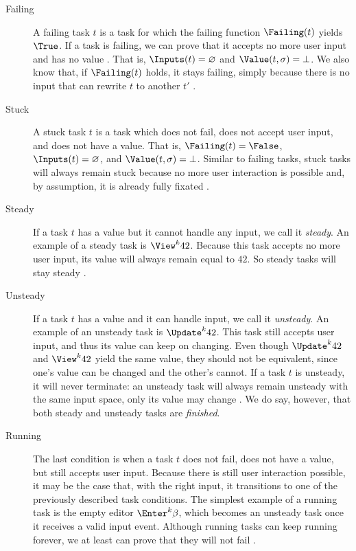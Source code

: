 \begin{description}

  \item[Failing]
    A failing task $t$ is a task for which the failing function $\Failing(t)$ yields $\True$.
    If a task is failing, we can prove that it accepts no more user input and has no value .
    That is, $\Inputs(t) = \nothing$ and $\Value(t,\sigma) = \bot$.
    We also know that, if $\Failing(t)$ holds, it stays failing,
    simply because there is no input that can rewrite $t$ to another $t'$ .

  \item[Stuck]
    A stuck task $t$ is a task which does not fail, does not accept user input, and does not have a value.
    That is, $\Failing(t) = \False$, $\Inputs(t) = \nothing$, and $\Value(t,\sigma) = \bot$.
    Similar to failing tasks, stuck tasks will always remain stuck because no more user interaction is possible and, by assumption, it is already fully fixated .

  \item[Steady]
    If a task $t$ has a value but it cannot handle any input, we call it \emph{steady}.
    An example of a steady task is $\View^k 42$.
    Because this task accepts no more user input, its value will always remain equal to $42$.
    So steady tasks will stay steady .

  \item[Unsteady]
    If a task $t$ has a value and it can handle input, we call it \emph{unsteady}.
    An example of an unsteady task is $\Update^k 42$.
    This task still accepts user input, and thus its value can keep on changing.
    Even though $\Update^k 42$ and $\View^k 42$ yield the same value,
    they should not be equivalent, since one's value can be changed and the other's cannot.
    If a task $t$ is unsteady, it will never terminate: an unsteady task will always remain unsteady with the same input space, only its value may change .
    We do say, however, that both steady and unsteady tasks are \emph{finished}.

  \item[Running]
    The last condition is when a task $t$ does not fail, does not have a value, but still accepts user input.
    Because there is still user interaction possible, it may be the case that, with the right input,
    it transitions to one of the previously described task conditions.
    The simplest example of a running task is the empty editor $\Enter^k \beta$, which becomes an unsteady task once it receives a valid input event.
    Although running tasks can keep running forever,
    we at least can prove that they will not fail .

\end{description}

